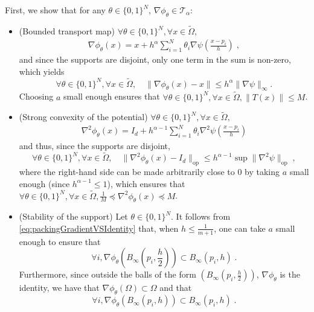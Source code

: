 \documentclass{article}
\theoremstyle{plain}
\theoremstyle{definition}
\theoremstyle{remark}
\newcommand\p[1]{\left( {#1}\right)}
\begin{document}
First, we show that for any $\theta \in \{0, 1 \}^{N}$, $\nabla \phi_{\theta} \in \mathcal{T}_{\alpha}$:
\begin{itemize}
\item (Bounded transport map) $\forall \theta \in \{0, 1 \}^{N}, \forall x \in \tilde{\Omega},$
    \begin{equation}
    \begin{aligned}
        \nabla \phi_{\theta}(x) = x + h^{\alpha} \sum_{i = 1}^{N} \theta_i \nabla \psi \p{\frac{x - p_i}{h}} \;,
    \end{aligned}
    \end{equation}
    and since the supports are disjoint, only one term in the sum is non-zero, which yields
    \begin{equation}
    \label{eq:packingGradientVSIdentity}
        \forall \theta \in \{0, 1 \}^{N}, \forall x \in \tilde{\Omega}, \quad \| \nabla \phi_{\theta}(x) - x \| \leq h^{\alpha} \|\nabla \psi \|_{\infty}.
    \end{equation}
    Choosing $a$ small enough ensures that $\forall \theta \in \{0, 1 \}^{N}, \forall x \in \tilde{\Omega}, \|T(x)\| \leq M$.

    \item (Strong convexity of the potential) $\forall \theta \in \{0, 1 \}^{N}, \forall x \in \tilde{\Omega},$
    \begin{equation}
    \begin{aligned}
        \nabla^2 \phi_{\theta}(x) = I_d + h^{\alpha - 1} \sum_{i = 1}^{N} \theta_i \nabla^2 \psi \p{\frac{x - p_i}{h}}
    \end{aligned}
    \end{equation}
    and thus, since the supports are disjoint,
    \begin{equation}
        \forall \theta \in \{0, 1 \}^{N}, \forall x \in \tilde{\Omega}, \quad \| \nabla^2 \phi_{\theta}(x) - I_d \|_{\text{op}} \leq h^{\alpha - 1} \sup \|\nabla^2 \psi \|_{\text{op}} \;,
    \end{equation}
    where the right-hand side can be made arbitrarily close to $0$ by taking $a$ small enough (since $h^{\alpha-1}\leq 1$), which ensures that $\forall \theta \in \{0, 1 \}^{N}, \forall x \in \tilde{\Omega}, \frac{1}{M} \preceq \nabla^2 \phi_\theta (x) \preceq M$. 
    
    

    \item (Stability of the support) Let $\theta \in \{0, 1 \}^{N}$. It follows from \eqref{eq:packingGradientVSIdentity} that, when $h \leq \frac{1}{m+1}$, one can take $a$ small enough to ensure that 
    \begin{equation}
        \forall i, \nabla \phi_{\theta} \p{B_{\infty}\p{p_i, \frac{h}{2}}} \subset B_{\infty}\p{p_i, h} \;.
    \end{equation}
    Furthermore, since outside the balls of the form $\p{B_{\infty}\p{p_i, \frac{h}{2}}}$, $\nabla \phi_{\theta}$ is the identity, we have that $\nabla \phi_{\theta}(\Omega) \subset \Omega$ and that 
    \begin{equation}
        \forall i, \nabla \phi_{\theta} \p{B_{\infty}\p{p_i, h}} \subset B_{\infty}\p{p_i, h} \;.
    \end{equation}
    

\end{itemize}
\end{document}
